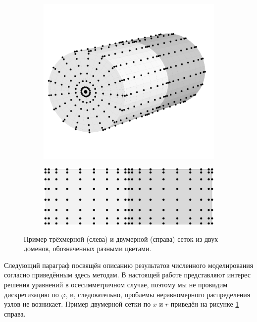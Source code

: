 \documentclass[12pt, a4paper]{report}
\begin{document}
\begin{figure}[h]
	\centering
	\begin{subfigure}{0.5\textwidth}
		\centering
		\includegraphics[width=.8\textwidth]{figures/Grid3D}
	\end{subfigure}
	\begin{subfigure}{0.48\textwidth}
		\centering
		\includegraphics[width=\textwidth]{figures/Grid2D}
	\end{subfigure}
	\caption{Пример трёхмерной (слева) и двумерной (справа) сеток из двух доменов, обозначенных разными цветами.}
	\label{fig:grid}
\end{figure}

Следующий параграф посвящён описанию результатов численного моделирования согласно приведённым здесь методам. В настоящей работе представляют интерес решения уравнений в осесимметричном случае, поэтому мы не провидим дискретизацию по $\varphi$, и, следовательно, проблемы неравномерного распределения узлов не возникает. Пример двумерной сетки по $x$ и $r$ приведён на рисунке \ref{fig:grid} справа.


\end{document}
